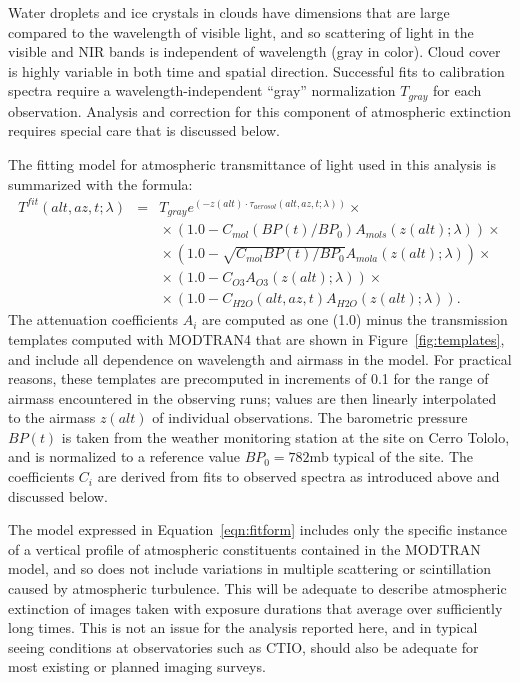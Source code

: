\documentclass[manuscript]{aastex}
\begin{document}
Water droplets and ice crystals in clouds have dimensions that are large compared to the wavelength of visible light, and so scattering of
light in the visible and NIR bands is independent of wavelength (gray in color).
Cloud cover is highly variable in both time and spatial direction.
Successful fits to calibration spectra require a wavelength-independent ``gray'' normalization $T_{gray}$ for each observation.
Analysis and correction for this component of atmospheric extinction requires special care that is discussed below.

The fitting model for atmospheric transmittance of light used in this analysis is summarized with the formula:
\begin{eqnarray}
\label{eqn:fitform}
T^{fit}(alt,az,t;\lambda) & = & T_{gray} e^{\left(-z(alt) \cdot \tau_{aerosol}(alt,az,t;\lambda)\right)}       \times {} \nonumber\\ 
    & & {}\times   (1.0 - C_{mol} (BP(t)/BP_0)     A_{mols}(z(alt);\lambda))                                   \times {} \nonumber\\
    & & {}\times   (1.0 - \sqrt{C_{mol}BP(t)/BP_0} A_{mola}(z(alt);\lambda))                                   \times {} \nonumber\\
    & & {}\times   (1.0 - C_{O3}                   A_{O3}  (z(alt);\lambda))                                   \times {} \nonumber\\
    & & {}\times   (1.0 - C_{H2O}(alt,az,t)        A_{H2O} (z(alt);\lambda)).
\end{eqnarray}
\noindent The attenuation coefficients $A_{i}$ are computed as one (1.0) minus the transmission templates computed with MODTRAN4
that are shown in Figure~\ref{fig:templates}, and include all dependence on wavelength and airmass in the model.
For practical reasons, these templates are precomputed in increments of 0.1 for the range of airmass encountered in the observing runs;
values are then linearly interpolated to the airmass $z(alt)$ of individual observations. 
The barometric pressure $BP(t)$ is taken from the weather monitoring station at the site on Cerro Tololo,
and is normalized to a reference value $BP_0 = 782$mb typical of the site.
The coefficients $C_{i}$ are derived from fits to observed spectra as introduced above and discussed below.

The model expressed in Equation~\ref{eqn:fitform} includes only the specific instance of a vertical profile
of atmospheric constituents contained in the MODTRAN model,
and so does not include variations in multiple scattering or scintillation caused by atmospheric turbulence.
This will be adequate to describe atmospheric extinction of images taken with exposure durations that average over sufficiently long times.
This is not an issue for the analysis reported here, and in typical seeing conditions at observatories such as CTIO,
should also be adequate for most existing or planned imaging surveys.     
\end{document}
